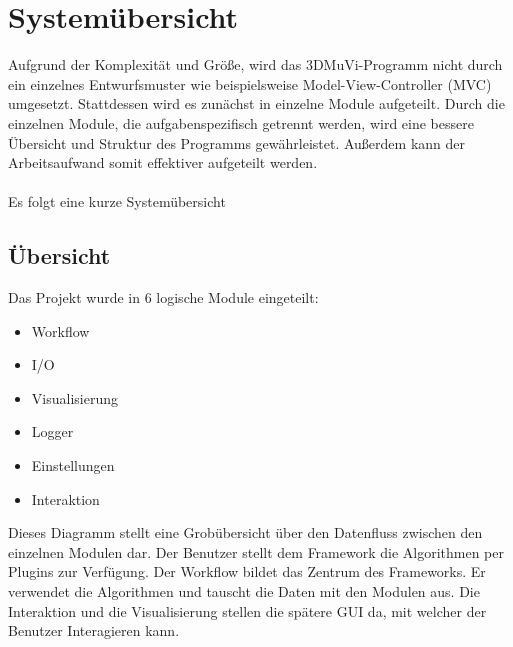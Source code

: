 \section{Systemübersicht}
Aufgrund der Komplexität und Größe, wird das 3DMuVi-Programm nicht durch ein einzelnes Entwurfsmuster wie beispielsweise Model-View-Controller (MVC) umgesetzt. Stattdessen wird es zunächst in einzelne Module aufgeteilt.
Durch die einzelnen Module, die aufgabenspezifisch getrennt werden, wird eine bessere Übersicht und Struktur des Programms gewährleistet. Außerdem kann der Arbeitsaufwand somit effektiver aufgeteilt werden.
\\\\
Es folgt eine kurze Systemübersicht
\subsection{Übersicht}
Das Projekt wurde in 6 logische Module eingeteilt:
\begin{itemize}
\item Workflow
\item I/O
\item Visualisierung
\item Logger
\item Einstellungen
\item Interaktion
\end{itemize}
Dieses Diagramm stellt eine Grobübersicht über den Datenfluss zwischen den einzelnen Modulen dar.
Der Benutzer stellt dem Framework die Algorithmen per Plugins zur Verfügung.
Der Workflow bildet das Zentrum des Frameworks. Er verwendet die Algorithmen und tauscht die Daten mit den Modulen aus.
Die Interaktion und die Visualisierung stellen die spätere GUI da, mit welcher der Benutzer Interagieren kann.\\
